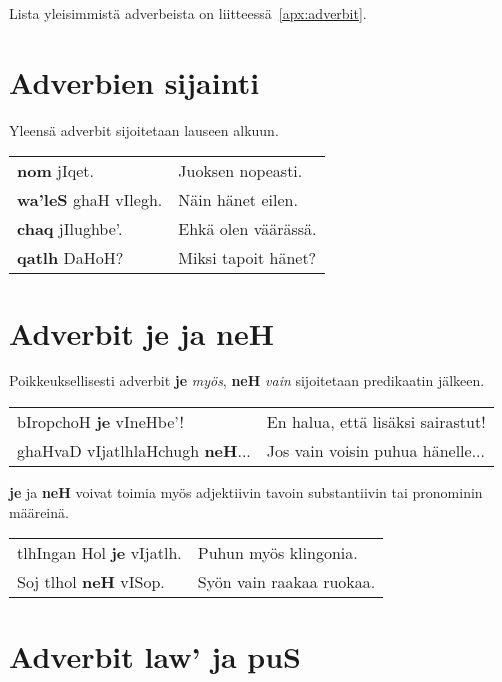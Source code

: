 \documentclass{book}
\begin{document}
Lista yleisimmistä adverbeista on liitteessä~\ref{apx:adverbit}.

\section{Adverbien sijainti}

Yleensä adverbit sijoitetaan lauseen alkuun.

\begin{tabular}{l l}
    \textbf{nom} jIqet. & Juoksen nopeasti. \\
    \textbf{wa'leS} ghaH vIlegh. & Näin hänet eilen. \\
    \textbf{chaq} jIlughbe'. & Ehkä olen väärässä. \\
    \textbf{qatlh} DaHoH? & Miksi tapoit hänet? \\
\end{tabular}

\section{Adverbit je ja neH}

Poikkeuksellisesti adverbit \textbf{je} \textit{myös}, \textbf{neH} \textit{vain} sijoitetaan predikaatin jälkeen.

\begin{tabular}{l l}
    bIropchoH \textbf{je} vIneHbe'! & En halua, että lisäksi sairastut! \\
    ghaHvaD vIjatlhlaHchugh \textbf{neH}... & Jos vain voisin puhua hänelle... \\
\end{tabular}

\textbf{je} ja \textbf{neH} voivat toimia myös adjektiivin tavoin substantiivin tai pronominin määreinä.

\begin{tabular}{l l}
    tlhIngan Hol \textbf{je} vIjatlh. & Puhun myös klingonia. \\
    Soj tlhol \textbf{neH} vISop. & Syön vain raakaa ruokaa. \\
\end{tabular}


\section{Adverbit law' ja puS}
\end{document}
